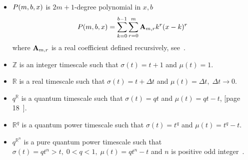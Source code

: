 \begin{itemize}
    \item $P ( m, b, x )$ is $2m+1$-degree polynomial in $x,b$
    \begin{equation}
        P ( m, b, x ) = \sum_{k=0}^{b-1} \sum_{r=0}^{m} {\mathbf{A}} \sb{m,r} k^r(x-k)^r
        \label{eq:polynomial_p}
    \end{equation}
    where ${\mathbf{A}} \sb{m,r}$ is a real coefficient defined recursively, see~\cite{kolosov2016link}.

    \item $\mathbb{Z}$ is an integer timescale such that $\sigma(t) = t+1$ and $\mu(t) = 1$.

    \item $\mathbb{R}$ is a real timescale such that $\sigma(t) = t+\Delta t$ and $\mu(t) = \Delta t, \; \Delta t \to 0$.

    \item $q^\mathbb{R}$ is a quantum timescale such that $\sigma(t) = qt$ and $\mu(t) = qt - t$,
    [page 18~\cite{Bohner2001DynamicEO}].

    \item $\mathbb{R}^q$ is a quantum power timescale such that $\sigma(t) = t^q$ and $\mu(t) = t^q - t$.

    \item $q^{\mathbb{R}^n}$ is a pure quantum power timescale
    such that $\sigma(t) = qt^n > t, \; 0<q<1, \; \mu(t) = qt^n - t$ and $n$ is positive
    odd integer~\cite{aldwoah2011power}.
\end{itemize}
